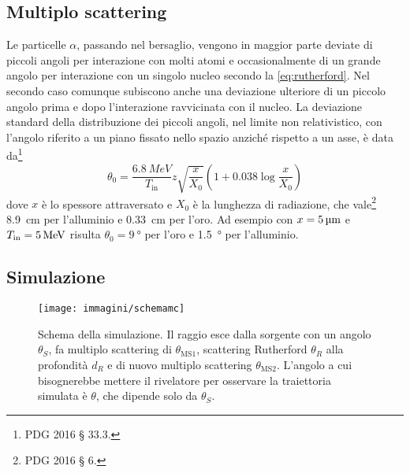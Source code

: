 \subsection{Multiplo scattering}

Le particelle $\alpha$, passando nel bersaglio,
vengono in maggior parte deviate di piccoli angoli per interazione con molti atomi
e occasionalmente di un grande angolo per interazione con un singolo nucleo secondo la \eqref{eq:rutherford}.
Nel secondo caso comunque subiscono anche una deviazione ulteriore di un piccolo angolo
prima e dopo l'interazione ravvicinata con il nucleo.
La deviazione standard della distribuzione dei piccoli angoli,
nel limite non relativistico,
con l'angolo riferito a un piano fissato nello spazio anziché rispetto a un asse,
è data da\footnote{PDG 2016 \S{} 33.3.}
\begin{equation}
	\label{eq:ms}
	\theta_0 = \frac {\SI{6.8}{MeV}} {T_\text{in}} z \sqrt{\frac{x}{X_0}} \left(1+0.038\log\frac x{X_0}\right)
\end{equation}
dove $x$ è lo spessore attraversato e $X_0$ è la lunghezza di radiazione,
che vale\footnote{PDG 2016 \S{} 6.} \SI{8.9}{cm} per l'alluminio e \SI{0.33}{cm} per l'oro.
Ad esempio con $x = \SI5{\micro m}$ e $T_\text{in} = \SI5{MeV}$
risulta $\theta_0 = \SI{9}\degree$ per l'oro e \SI{1.5}{\degree} per l'alluminio.

\subsection{Simulazione}

\begin{figure}
	\centering
	\texttt{[image: immagini/schemamc]}
	\caption{\label{fig:schemamc}
	Schema della simulazione.
	Il raggio esce dalla sorgente con un angolo $\theta_S$,
	fa multiplo scattering di $\theta_\text{MS1}$,
	scattering Rutherford $\theta_R$ alla profondità $d_R$
	e di nuovo multiplo scattering $\theta_\text{MS2}$.
	L'angolo a cui bisognerebbe mettere il rivelatore per osservare la traiettoria simulata è $\theta$,
	che dipende solo da $\theta_S$.}
\end{figure}

